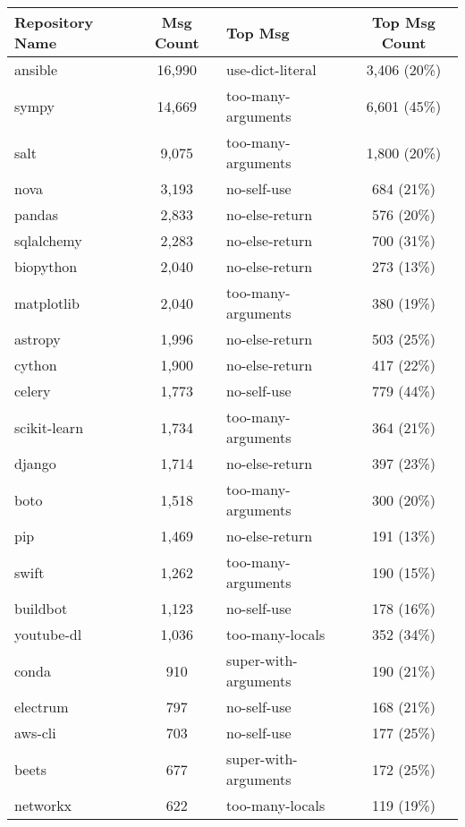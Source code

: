 \begin{table}[ht]
  \tiny
  \centering
  \begin{tabularx}{0.8\textwidth} {
    | l 
    | c
    | >{\centering\arraybackslash}X 
    | c |
  }
    \hline
    Repository Name & Msg Count & Top Msg & Top Msg Count \\
    \hline\hline
    ansible & 16,990 & use-dict-literal & 3,406 (20\%) \\ \hline
    sympy & 14,669 & too-many-arguments & 6,601 (45\%) \\ \hline
    salt & 9,075 & too-many-arguments & 1,800 (20\%) \\ \hline
    nova & 3,193 & no-self-use & 684 (21\%) \\ \hline
    pandas & 2,833 & no-else-return & 576 (20\%) \\ \hline
    sqlalchemy & 2,283 & no-else-return & 700 (31\%) \\ \hline
    biopython & 2,040 & no-else-return & 273 (13\%) \\ \hline
    matplotlib & 2,040 & too-many-arguments & 380 (19\%) \\ \hline
    astropy & 1,996 & no-else-return & 503 (25\%) \\ \hline
    cython & 1,900 & no-else-return & 417 (22\%) \\ \hline
    celery & 1,773 & no-self-use & 779 (44\%) \\ \hline
    scikit-learn & 1,734 & too-many-arguments & 364 (21\%) \\ \hline
    django & 1,714 & no-else-return & 397 (23\%) \\ \hline
    boto & 1,518 & too-many-arguments & 300 (20\%) \\ \hline
    pip & 1,469 & no-else-return & 191 (13\%) \\ \hline
    swift & 1,262 & too-many-arguments & 190 (15\%) \\ \hline
    buildbot & 1,123 & no-self-use & 178 (16\%) \\ \hline
    youtube-dl & 1,036 & too-many-locals & 352 (34\%) \\ \hline
    conda & 910 & super-with-arguments & 190 (21\%) \\ \hline
    electrum & 797 & no-self-use & 168 (21\%) \\ \hline
    aws-cli & 703 & no-self-use & 177 (25\%) \\ \hline
    beets & 677 & super-with-arguments & 172 (25\%) \\ \hline
    networkx & 622 & too-many-locals & 119 (19\%) \\ \hline

\end{tabularx}
\end{table}
